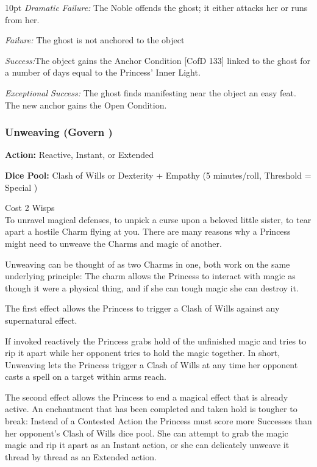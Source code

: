 \begin{myindentpar}{10pt} \emph{Dramatic Failure:} The Noble offends the ghost; it either attacks her or runs from her.

\emph{Failure:} The ghost is not anchored to the object

\emph{Success:}The object gains the Anchor Condition [CofD 133] linked to the ghost for a number of days equal to the Princess’ Inner Light.

\emph{Exceptional Success:}	 The ghost finds manifesting near the object an easy feat. The new anchor gains the Open Condition.

\end{myindentpar}

\subsubsection*{Unweaving (Govern \textbullet\textbullet\textbullet\textbullet)}

\noindent \textbf{Action:} Reactive, Instant, or Extended

\noindent \textbf{Dice Pool:} Clash of Wills or Dexterity + Empathy (5 minutes/roll, Threshold = Special )

\noindent Cost 2 Wisps\\

To unravel magical defenses, to unpick a curse upon a beloved little sister, to tear apart a hostile Charm flying at you. There are many reasons why a Princess might need to unweave the Charms and magic of another. 

Unweaving can be thought of as two Charms in one, both work on the same underlying principle: The charm allows the Princess to interact with magic as though it were a physical thing, and if she can tough magic she can destroy it.

The first effect allows the Princess to trigger a Clash of Wills against any supernatural effect. 

If invoked reactively the Princess grabs hold of the unfinished magic and tries to rip it apart while her opponent tries to hold the magic together. In short, Unweaving lets the Princess trigger a Clash of Wills at any time her opponent casts a spell on a target within arms reach.

The second effect allows the Princess to end a magical effect that is already active. An enchantment that has been completed and taken hold is tougher to break: Instead of a Contested Action the Princess must score more Successes than her opponent's Clash of Wills dice pool. She can attempt to grab the magic magic and rip it apart as an Instant action, or she can delicately unweave it thread by thread as an Extended action. 

